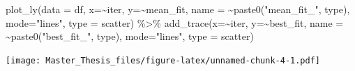 \documentclass[
  oneside]{book}
\newenvironment{Shaded}{\begin{snugshade}}{\end{snugshade}}
\newcommand{\AttributeTok}[1]{\textcolor[rgb]{0.77,0.63,0.00}{#1}}
\newcommand{\FunctionTok}[1]{\textcolor[rgb]{0.00,0.00,0.00}{#1}}
\newcommand{\NormalTok}[1]{#1}
\newcommand{\SpecialCharTok}[1]{\textcolor[rgb]{0.00,0.00,0.00}{#1}}
\newcommand{\StringTok}[1]{\textcolor[rgb]{0.31,0.60,0.02}{#1}}
\begin{document}
\begin{Shaded}
\begin{Highlighting}[]
\FunctionTok{plot\_ly}\NormalTok{(}\AttributeTok{data =}\NormalTok{ df, }\AttributeTok{x=}\SpecialCharTok{\textasciitilde{}}\NormalTok{iter, }\AttributeTok{y=}\SpecialCharTok{\textasciitilde{}}\NormalTok{mean\_fit, }\AttributeTok{name =} \SpecialCharTok{\textasciitilde{}}\FunctionTok{paste0}\NormalTok{(}\StringTok{"mean\_fit\_"}\NormalTok{, type), }\AttributeTok{mode=}\StringTok{"lines"}\NormalTok{, }\AttributeTok{type =} \StringTok{\textquotesingle{}scatter\textquotesingle{}}\NormalTok{) }\SpecialCharTok{\%\textgreater{}\%}   \FunctionTok{add\_trace}\NormalTok{(}\AttributeTok{x=}\SpecialCharTok{\textasciitilde{}}\NormalTok{iter, }\AttributeTok{y=}\SpecialCharTok{\textasciitilde{}}\NormalTok{best\_fit, }\AttributeTok{name =} \SpecialCharTok{\textasciitilde{}}\FunctionTok{paste0}\NormalTok{(}\StringTok{"best\_fit\_"}\NormalTok{, type), }\AttributeTok{mode=}\StringTok{"lines"}\NormalTok{, }\AttributeTok{type =} \StringTok{\textquotesingle{}scatter\textquotesingle{}}\NormalTok{)}
\end{Highlighting}
\end{Shaded}

\texttt{[image: Master\_Thesis\_files/figure-latex/unnamed-chunk-4-1.pdf]}
\end{document}
